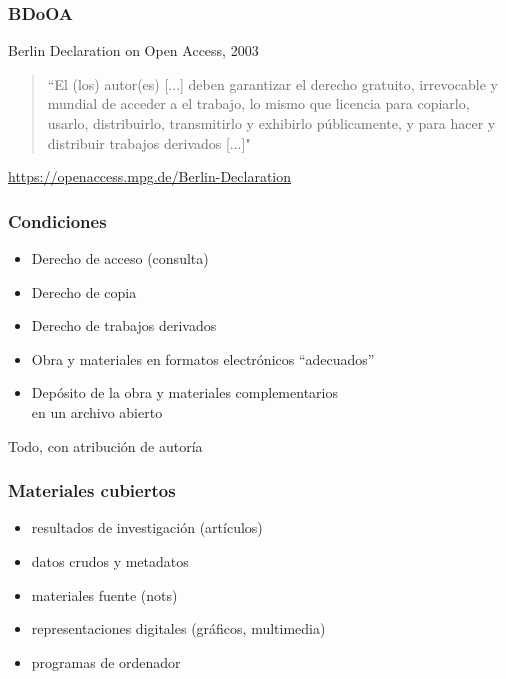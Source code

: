 \documentclass[17pt,aspectratio=169]{beamer}
\begin{document}

\begin{frame}
\frametitle{BDoOA}

Berlin Declaration on Open Access, 2003

\vspace{.3cm}

\begin{quote}
  ``El (los) autor(es) [...] deben garantizar el derecho gratuito, irrevocable y mundial de acceder a el trabajo, lo mismo que licencia para copiarlo, usarlo, distribuirlo, transmitirlo y exhibirlo públicamente, y para hacer y distribuir trabajos derivados [...]"
\end{quote}


\begin{flushright}
  {\small \url{https://openaccess.mpg.de/Berlin-Declaration}}
\end{flushright}

\end{frame}


\begin{frame}
\frametitle{Condiciones}

\begin{itemize}
\item Derecho de acceso (consulta)
\item Derecho de copia
\item Derecho de trabajos derivados
\item Obra y materiales en formatos electrónicos ``adecuados''
\item Depósito de la obra y materiales complementarios \\
  en un archivo abierto
\end{itemize}

Todo, con atribución de autoría

\end{frame}


\begin{frame}
\frametitle{Materiales cubiertos}

\begin{itemize}
\item resultados de investigación (artículos)
\item datos crudos y metadatos
\item materiales fuente (nots)
\item representaciones digitales (gráficos, multimedia)
\item programas de ordenador
\end{itemize}

\end{frame}
\end{document}
